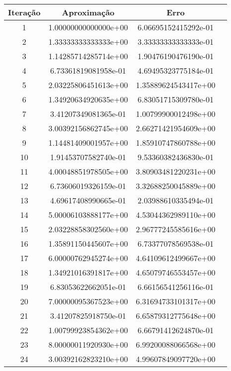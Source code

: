 \begin{table}[H]
\centering 
\begin{tabular}{|c|c|c|c|}
\hline 
Iteração & Aproximação & Erro \\ 
\hline 
1 & 1.00000000000000e+00 &  6.06695152415292e-01 \\ 
\hline
2 & 1.33333333333333e+00 &  3.33333333333333e-01 \\ 
\hline
3 & 1.14285714285714e+00 &  1.90476190476190e-01 \\ 
\hline
4 & 6.73361819081958e-01 &  4.69495323775184e-01 \\ 
\hline
5 & 2.03225806451613e+00 &  1.35889624543417e+00 \\ 
\hline
6 & 1.34920634920635e+00 &  6.83051715309780e-01 \\ 
\hline
7 & 3.41207349081365e-01 &  1.00799900012498e+00 \\ 
\hline
8 & 3.00392156862745e+00 &  2.66271421954609e+00 \\ 
\hline
9 & 1.14481409001957e+00 &  1.85910747860788e+00 \\ 
\hline
10 & 1.91453707582740e-01 &  9.53360382436830e-01 \\ 
\hline
11 & 4.00048851978505e+00 &  3.80903481220231e+00 \\ 
\hline
12 & 6.73606019326159e-01 &  3.32688250045889e+00 \\ 
\hline
13 & 4.69617408990665e-01 &  2.03988610335494e-01 \\ 
\hline
14 & 5.00006103888177e+00 &  4.53044362989110e+00 \\ 
\hline
15 & 2.03228858302560e+00 &  2.96777245585616e+00 \\ 
\hline
16 & 1.35891150445607e+00 &  6.73377078569538e-01 \\ 
\hline
17 & 6.00000762945274e+00 &  4.64109612499667e+00 \\ 
\hline
18 & 1.34921016391817e+00 &  4.65079746553457e+00 \\ 
\hline
19 & 6.83053622662051e-01 &  6.66156541256116e-01 \\ 
\hline
20 & 7.00000095367523e+00 &  6.31694733101317e+00 \\ 
\hline
21 & 3.41207825918750e-01 &  6.65879312775648e+00 \\ 
\hline
22 & 1.00799923854362e+00 &  6.66791412624870e-01 \\ 
\hline
23 & 8.00000011920930e+00 &  6.99200088066568e+00 \\ 
\hline
24 & 3.00392162823210e+00 &  4.99607849097720e+00 \\ 

\end{tabular}
\end{table}
